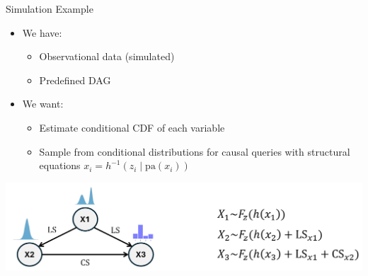 \documentclass[onlytextwidth,english]{beamer}\usepackage[]{graphicx}\usepackage[]{xcolor}
\begin{document}
\begin{frame}{Simulation Example}
  \begin{itemize}
    \item We have:
    \begin{itemize}
      \item Observational data (simulated)
      \item Predefined DAG
    \end{itemize}
    \item We want:
    \begin{itemize}
      \item Estimate conditional CDF of each variable
      \item Sample from conditional distributions for causal queries with structural equations $x_i = h^{-1}(z_i \mid \text{pa}(x_i))$
    \end{itemize}
  \end{itemize}

  \vfill
  \centering
  \includegraphics[width=0.7\linewidth]{img/Simulation_Example.png}
\end{frame}



% 
% 
% 
% 
% 
% 
% 
% 
% 
% 
\end{document}
